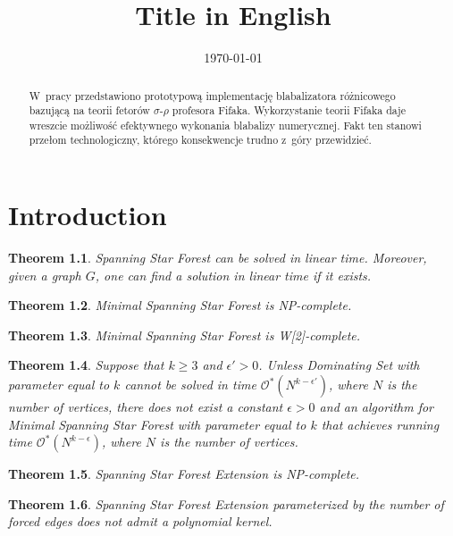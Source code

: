 \documentclass[en]{pracamgr}
\title{Title in English}
\date{\monthyeardate\today}
\newtheorem{theorem}{Theorem}
\newcommand{\ssfp}{{\sc Spanning Star Forest}}
\newcommand{\mssfp}{{\sc Minimal Spanning Star Forest}}
\newcommand{\ssfep}{{\sc Spanning Star Forest Extension}}
\newcommand{\domsetp}{{\sc Dominating Set}}
\begin{document}
\maketitle

\begin{abstract}
  W~pracy przedstawiono prototypową implementację blabalizatora
  różnicowego bazującą na teorii fetorów $\sigma$-$\rho$ profesora
  Fifaka.  Wykorzystanie teorii Fifaka daje wreszcie możliwość
  efektywnego wykonania blabalizy numerycznej.  Fakt ten stanowi
  przełom technologiczny, którego konsekwencje trudno z~góry
  przewidzieć.
\end{abstract}

\tableofcontents

\chapter{Introduction}

\begin{theorem}\label{thm-ssfp}
	\ssfp{} can be solved in linear time. Moreover, given a graph $G$, one can find a solution in linear time if it exists.
\end{theorem}

\begin{theorem}\label{thm-mssfp-npc}
	\mssfp{} is \textup{NP}-complete.
\end{theorem}

\begin{theorem}\label{thm-mssfp-w2c}
	\mssfp{} is \textup{W[2]}-complete.
\end{theorem}

\begin{theorem}\label{thm-mssfp-time}
	Suppose that $k \geq 3$ and $\epsilon' > 0$. Unless \domsetp{} with parameter equal to $k$ cannot be solved in time $\mathcal{O}^*(N^{k-\epsilon'})$, where $N$ is the number of vertices, there does not exist a constant $\epsilon >0$ and an algorithm for \mssfp{} with parameter equal to $k$ that achieves running time  $\mathcal{O}^*(N^{k-\epsilon})$, where $N$ is the number of vertices.
\end{theorem}

\begin{theorem}
	\ssfep{} is \textup{NP}-complete.
\end{theorem}

\begin{theorem}
	\ssfep{} parameterized by the number of forced edges does not admit a polynomial kernel.
\end{theorem}
\end{document}
